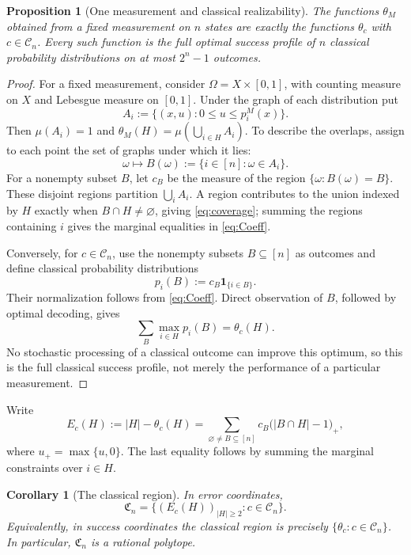 \documentclass[a4paper,11pt,onecolumn,unpublished]{quantumarticle}
\newtheorem{proposition}[theorem]{Proposition}
\newtheorem{corollary}[theorem]{Corollary}
\theoremstyle{definition}
\newcommand{\1}{\mathbf 1}
\newcommand{\Coeff}{\mathcal C}
\newcommand{\Creg}{\mathfrak C}
\begin{document}
\begin{proposition}[One measurement and classical realizability]
\label{prop:one-measurement}
The functions $\theta_M$ obtained from a fixed measurement on $n$ states are
exactly the functions $\theta_c$ with $c\in\Coeff_n$. Every such function is
the \emph{full optimal success profile} of $n$ classical probability
distributions on at most $2^n-1$ outcomes.
\end{proposition}
\begin{proof}
For a fixed measurement, consider $\Omega=X\times[0,1]$, with counting measure
on $X$ and Lebesgue measure on $[0,1]$. Under the graph of each distribution put
\[
 A_i:=\{(x,u):0\le u\le p_i^M(x)\}.
\]
Then $\mu(A_i)=1$ and
$\theta_M(H)=\mu(\bigcup_{i\in H}A_i)$.
To describe the overlaps, assign to each point the set of graphs under which
it lies:
\[
 \omega\longmapsto B(\omega):=\{i\in[n]:\omega\in A_i\}.
\]
For a nonempty subset $B$, let $c_B$ be the measure of the region
$\{\omega:B(\omega)=B\}$. These disjoint regions partition
$\bigcup_i A_i$. A region contributes to the union indexed by $H$ exactly when
$B\cap H\ne\varnothing$, giving \eqref{eq:coverage}; summing the regions
containing $i$ gives the marginal equalities in \eqref{eq:Coeff}.

Conversely, for $c\in\Coeff_n$, use the nonempty subsets $B\subseteq[n]$ as
outcomes and define classical probability distributions
\begin{equation}\label{eq:classical-distributions}
 p_i(B):=c_B\1_{\{i\in B\}}.
\end{equation}
Their normalization follows from \eqref{eq:Coeff}. Direct observation of $B$,
followed by optimal decoding, gives
\[
 \sum_B\max_{i\in H}p_i(B)=\theta_c(H).
\]
No stochastic processing of a classical outcome can improve this optimum, so
this is the full classical success profile, not merely the performance of a
particular measurement.
\end{proof}

Write
\begin{equation}\label{eq:E-c}
 E_c(H):=|H|-\theta_c(H)
       =\sum_{\varnothing\ne B\subseteq[n]}c_B\bigl(|B\cap H|-1\bigr)_+,
\end{equation}
where $u_+=\max\{u,0\}$. The last equality follows by summing the marginal
constraints over $i\in H$.

\begin{corollary}[The classical region]\label{cor:classical-region}
In error coordinates,
\begin{equation}\label{eq:Creg}
 \Creg_n=\{(E_c(H))_{|H|\ge2}:c\in\Coeff_n\}.
\end{equation}
Equivalently, in success coordinates the classical region is precisely
$\{\theta_c:c\in\Coeff_n\}$. In particular, $\Creg_n$ is a rational polytope.
\end{corollary}
\end{document}

